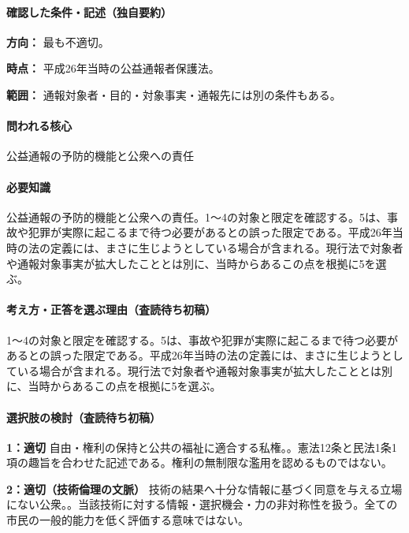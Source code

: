 \paragraph{確認した条件・記述（独自要約）}\mbox{}\par

\noindent\textbf{方向：} 最も不適切。\par

\noindent\textbf{時点：} 平成26年当時の公益通報者保護法。\par

\noindent\textbf{範囲：} 通報対象者・目的・対象事実・通報先には別の条件もある。\par

\paragraph{問われる核心} 公益通報の予防的機能と公衆への責任

\paragraph{必要知識} 公益通報の予防的機能と公衆への責任。1〜4の対象と限定を確認する。5は、事故や犯罪が実際に起こるまで待つ必要があるとの誤った限定である。平成26年当時の法の定義には、まさに生じようとしている場合が含まれる。現行法で対象者や通報対象事実が拡大したこととは別に、当時からあるこの点を根拠に5を選ぶ。

\paragraph{考え方・正答を選ぶ理由（査読待ち初稿）} 1〜4の対象と限定を確認する。5は、事故や犯罪が実際に起こるまで待つ必要があるとの誤った限定である。平成26年当時の法の定義には、まさに生じようとしている場合が含まれる。現行法で対象者や通報対象事実が拡大したこととは別に、当時からあるこの点を根拠に5を選ぶ。

\paragraph{選択肢の検討（査読待ち初稿）}\mbox{}\par

\noindent\textbf{1：適切} 自由・権利の保持と公共の福祉に適合する私権。。憲法12条と民法1条1項の趣旨を合わせた記述である。権利の無制限な濫用を認めるものではない。\par

\noindent\textbf{2：適切（技術倫理の文脈）} 技術の結果へ十分な情報に基づく同意を与える立場にない公衆。。当該技術に対する情報・選択機会・力の非対称性を扱う。全ての市民の一般的能力を低く評価する意味ではない。\par


